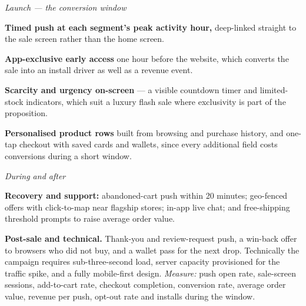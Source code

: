 \begin{qlist}
\textit{Launch --- the conversion window}
\begin{apts}\setcounter{enumi}{4}
\item \textbf{Timed push at each segment's peak activity hour,} deep-linked
      straight to the sale screen rather than the home screen.
\item \textbf{App-exclusive early access} one hour before the website, which
      converts the sale into an install driver as well as a revenue event.
\item \textbf{Scarcity and urgency on-screen} --- a visible countdown timer and
      limited-stock indicators, which suit a luxury flash sale where exclusivity
      is part of the proposition.
\item \textbf{Personalised product rows} built from browsing and purchase
      history, and one-tap checkout with saved cards and wallets, since every
      additional field costs conversions during a short window.
\end{apts}

\textit{During and after}
\begin{apts}\setcounter{enumi}{8}
\item \textbf{Recovery and support:} abandoned-cart push within 20 minutes;
      geo-fenced offers with click-to-map near flagship stores; in-app live
      chat; and free-shipping threshold prompts to raise average order value.
\item \textbf{Post-sale and technical.} Thank-you and review-request push, a
      win-back offer to browsers who did not buy, and a wallet pass for the next
      drop. Technically the campaign requires sub-three-second load, server
      capacity provisioned for the traffic spike, and a fully mobile-first
      design. \emph{Measure:} push open rate, sale-screen sessions, add-to-cart
      rate, checkout completion, conversion rate, average order value, revenue
      per push, opt-out rate and installs during the window.
\end{apts}


\end{qlist}
